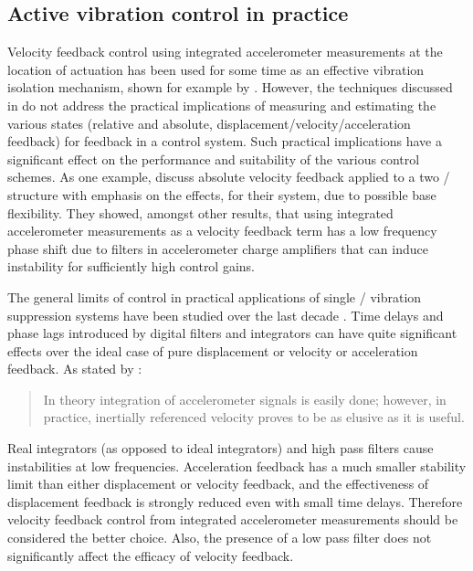 \documentclass[11pt,a4paper]{memoir}
\begin{document}
\subsection{Active vibration control in practice}

Velocity feedback control using integrated accelerometer measurements at the location of actuation has been used for some time as an effective vibration isolation mechanism, shown for example by \textcite{kim1999}.
However, the techniques discussed in  do not address the practical implications of measuring and estimating the various states (relative and absolute, displacement/velocity/acceleration feedback) for feedback in a control system.
Such practical implications have a significant effect on the performance and suitability of the various control schemes.
As one example, \textcite{serrand2000} discuss absolute velocity feedback applied to a two \dof/ structure with emphasis on the effects, for their system, due to possible base flexibility.
They showed, amongst other results, that using integrated accelerometer measurements as a velocity feedback term has a low frequency phase shift due to filters in accelerometer charge amplifiers that can induce instability for sufficiently high control gains.

The general limits of control in practical applications of single \dof/ vibration suppression systems have been studied over the last decade \cite{ananthaganeshan2001,brennan2007-jsv}. Time delays and phase lags introduced by digital filters
and integrators can have quite significant effects over the ideal case of pure displacement or velocity or acceleration feedback.
As stated by \mbox{\textcite{williams2009}}:
\begin{quote}
In theory integration of accelerometer signals is easily done; however, in practice, inertially referenced velocity proves to be as \mbox{elusive} as it is useful.
\end{quote}
Real integrators (as opposed to ideal integrators) and high pass filters cause instabilities at low frequencies.
Acceleration feedback has a much smaller stability limit than either displacement or velocity feedback, and the effectiveness of displacement feedback is strongly reduced even with small time delays.
Therefore velocity feedback control from integrated accelerometer measurements should be considered the better choice.
Also, the presence of a low pass filter does not significantly affect the efficacy of velocity feedback.
\end{document}

